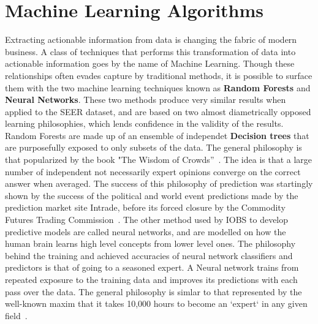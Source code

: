 \documentclass[a4paper,11pt]{article}
\begin{document}
\section{Machine Learning Algorithms}


Extracting actionable information from data is changing the fabric of modern business. A class of techniques that performs this transformation of data into actionable information goes by the name of Machine Learning.
Though these relationships often evades capture by traditional methods, it is possible to surface them with the two machine learning techniques known as \textbf{Random Forests} and \textbf{Neural Networks}.
These two methods produce very similar results when applied to the SEER dataset, and are based on two almost diametrically opposed learning philosophies, which lends confidence in the validity of the results. 
Random Forests are made up of an ensemble of independet \textbf{Decision trees} that are purposefully exposed to only subsets of the data. The general philosophy is that popularized by the book "The Wisdom of Crowds''~\cite{wisdom}.
The idea is that a large number of independent not necessarily expert opinions converge on the correct answer when averaged. The success of this philosophy of prediction was startingly shown by the success of the political and world event predictions made by the prediction market site Intrade, before its forced closure by the Commodity Futures Trading Commission~\cite{cassidy}. %
 The other method used by IOBS to develop predictive models are called neural networks, and are modelled on how the human brain learns high level concepts from lower level ones. The philosophy behind the training and achieved accuracies of neural network classifiers and predictors is that of going to a seasoned expert. A Neural network trains from repeated exposure to the training data and improves its predictions with each pass over the data. The general philosophy is simlar to that represented by the well-known maxim that it takes 10,000 hours to become an `expert` in any given field~\cite{outliers}.
\end{document}

